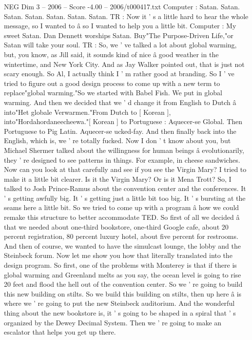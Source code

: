 \begin{textsample}{NEG Dim 3 – 2006 – Score -4.00 – 2006/t000417.txt}
Computer : Satan.
Satan.
Satan.
Satan.
Satan.
Satan.
Satan.
TR : Now it ' s a little hard to hear the whole message, so I wanted to â so I wanted to help you a little bit.
Computer : My sweet Satan.
Dan Dennett worships Satan.
Buy"The Purpose-Driven Life,"or Satan will take your soul.
TR : So, we ' ve talked a lot about global warming, but, you know, as Jill said, it sounds kind of nice â good weather in the wintertime, and New York City.
And as Jay Walker pointed out, that is just not scary enough.
So Al, I actually think I ' m rather good at branding.
So I ' ve tried to figure out a good design process to come up with a new term to replace"global warming."So we started with Babel Fish.
We put in global warming.
And then we decided that we ' d change it from English to Dutch â into"Het globale Verwarmen."From Dutch to [ Korean ], into"Hordahordaneecheewa."[ Korean ] to Portuguese : Aquecer-se Global.
Then Portuguese to Pig Latin.
Aquecer-se ucked-fay.
And then finally back into the English, which is, we ' re totally fucked.
Now I don ' t know about you, but Michael Shermer talked about the willingness for human beings â evolutionarily, they ' re designed to see patterns in things.
For example, in cheese sandwiches.
Now can you look at that carefully and see if you see the Virgin Mary?
I tried to make it a little bit clearer.
Is it the Virgin Mary?
Or is it Mena Trott?
So, I talked to Josh Prince-Ramus about the convention center and the conferences.
It ' s getting awfully big.
It ' s getting just a little bit too big.
It ' s bursting at the seams here a little bit.
So we tried to come up with a program â how we could remake this structure to better accommodate TED.
So first of all we decided â that we needed about one-third bookstore, one-third Google cafe, about 20 percent registration, 80 percent luxury hotel, about five percent for restrooms.
And then of course, we wanted to have the simulcast lounge, the lobby and the Steinbeck forum.
Now let me show you how that literally translated into the design program.
So first, one of the problems with Monterey is that if there is global warming and Greenland melts as you say, the ocean level is going to rise 20 feet and flood the hell out of the convention center.
So we ' re going to build this new building on stilts.
So we build this building on stilts, then up here â is where we ' re going to put the new Steinbeck auditorium.
And the wonderful thing about the new bookstore is, it ' s going to be shaped in a spiral that ' s organized by the Dewey Decimal System.
Then we ' re going to make an escalator that helps you get up there.

\end{textsample}
